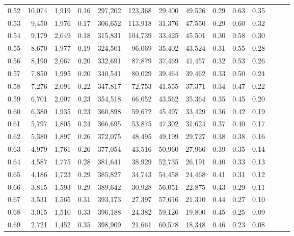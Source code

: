\begin{tabular}{rrrrrrrrrrrrrr}
0.52 &  10,074 &  1,919 &  0.16 &  297,202 &  123,368 &  29,400 &  49,526 &  0.29 &  0.63 &      0.35 \\
0.53 &   9,450 &  1,976 &  0.17 &  306,652 &  113,918 &  31,376 &  47,550 &  0.29 &  0.60 &      0.32 \\
0.54 &   9,179 &  2,049 &  0.18 &  315,831 &  104,739 &  33,425 &  45,501 &  0.30 &  0.58 &      0.30 \\
0.55 &   8,670 &  1,977 &  0.19 &  324,501 &   96,069 &  35,402 &  43,524 &  0.31 &  0.55 &      0.28 \\
0.56 &   8,190 &  2,067 &  0.20 &  332,691 &   87,879 &  37,469 &  41,457 &  0.32 &  0.53 &      0.26 \\
0.57 &   7,850 &  1,995 &  0.20 &  340,541 &   80,029 &  39,464 &  39,462 &  0.33 &  0.50 &      0.24 \\
0.58 &   7,276 &  2,091 &  0.22 &  347,817 &   72,753 &  41,555 &  37,371 &  0.34 &  0.47 &      0.22 \\
0.59 &   6,701 &  2,007 &  0.23 &  354,518 &   66,052 &  43,562 &  35,364 &  0.35 &  0.45 &      0.20 \\
0.60 &   6,380 &  1,935 &  0.23 &  360,898 &   59,672 &  45,497 &  33,429 &  0.36 &  0.42 &      0.19 \\
0.61 &   5,797 &  1,805 &  0.24 &  366,695 &   53,875 &  47,302 &  31,624 &  0.37 &  0.40 &      0.17 \\
0.62 &   5,380 &  1,897 &  0.26 &  372,075 &   48,495 &  49,199 &  29,727 &  0.38 &  0.38 &      0.16 \\
0.63 &   4,979 &  1,761 &  0.26 &  377,054 &   43,516 &  50,960 &  27,966 &  0.39 &  0.35 &      0.14 \\
0.64 &   4,587 &  1,775 &  0.28 &  381,641 &   38,929 &  52,735 &  26,191 &  0.40 &  0.33 &      0.13 \\
0.65 &   4,186 &  1,723 &  0.29 &  385,827 &   34,743 &  54,458 &  24,468 &  0.41 &  0.31 &      0.12 \\
0.66 &   3,815 &  1,593 &  0.29 &  389,642 &   30,928 &  56,051 &  22,875 &  0.43 &  0.29 &      0.11 \\
0.67 &   3,531 &  1,565 &  0.31 &  393,173 &   27,397 &  57,616 &  21,310 &  0.44 &  0.27 &      0.10 \\
0.68 &   3,015 &  1,510 &  0.33 &  396,188 &   24,382 &  59,126 &  19,800 &  0.45 &  0.25 &      0.09 \\
0.69 &   2,721 &  1,452 &  0.35 &  398,909 &   21,661 &  60,578 &  18,348 &  0.46 &  0.23 &      0.08 \\

\end{tabular}
